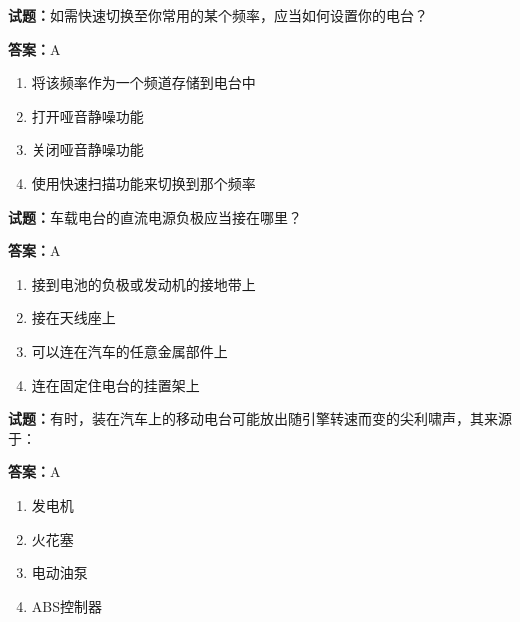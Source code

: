 \documentclass{ctexbook}
\begin{document}


\vspace{1em}

\textbf{试题：}如需快速切换至你常用的某个频率，应当如何设置你的电台？ 

\textbf{答案：}A 

\begin{enumerate}[leftmargin=3em]
  \item 将该频率作为一个频道存储到电台中 

  \item 打开哑音静噪功能 

  \item 关闭哑音静噪功能 

  \item 使用快速扫描功能来切换到那个频率 

\end{enumerate}





\vspace{1em}

\textbf{试题：}车载电台的直流电源负极应当接在哪里？ 

\textbf{答案：}A 

\begin{enumerate}[leftmargin=3em]
  \item 接到电池的负极或发动机的接地带上 

  \item 接在天线座上 

  \item 可以连在汽车的任意金属部件上 

  \item 连在固定住电台的挂置架上 

\end{enumerate}





\vspace{1em}

\textbf{试题：}有时，装在汽车上的移动电台可能放出随引擎转速而变的尖利啸声，其来源于： 

\textbf{答案：}A 

\begin{enumerate}[leftmargin=3em]
  \item 发电机 


  \item 火花塞 

  \item 电动油泵 

  \item ABS控制器 

\end{enumerate}
\end{document}

